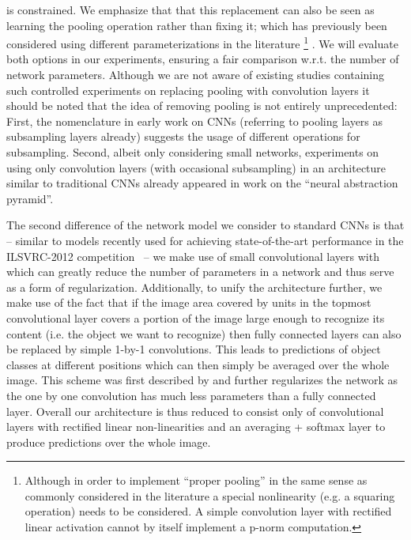\documentclass{article} \usepackage{iclr2015,times}
\begin{document}
is constrained.
We emphasize that that this
replacement can also be seen as 
learning the pooling operation rather than fixing it; which has
previously been considered using different parameterizations in the
literature \footnote{Although in order
  to implement ``proper pooling'' in the same sense as commonly
  considered in the literature a special nonlinearity (e.g. a squaring operation) needs to be
  considered. A simple convolution layer with rectified linear
  activation cannot by itself implement a p-norm computation.}
\citep{LeCun_IEEE1998,Gulcehre_2014,Jia_2012}.
We will evaluate both options in our experiments, ensuring a fair
comparison w.r.t. the number of network parameters. 
Although we are not aware of existing studies   
containing such controlled experiments on replacing pooling with convolution layers
it should be noted that the idea of removing pooling is not entirely unprecedented: 
First, the nomenclature in early work on CNNs \cite{LeCun_IEEE1998} (referring to pooling layers  as 
subsampling layers already) suggests the usage of different operations for subsampling. 
Second, albeit only considering small networks, 
experiments on using only convolution layers (with occasional subsampling) in an architecture similar
to traditional CNNs already appeared in work on the ``neural abstraction pyramid''\cite{Behnke2003}.

The second difference of the network model we consider to standard
CNNs is that -- similar to models recently used for achieving
state-of-the-art performance in the ILSVRC-2012 competition~\citep{VGG_2014,GoingDeep_2014} -- 
we make use of small convolutional layers with  which can
greatly reduce the number of parameters in a network and thus serve as
a form of regularization. 
Additionally, to unify the architecture further, we make use of the
fact that if the image area covered by units in the topmost
convolutional layer covers a portion of the image large enough to
recognize its content (i.e. the object we want to recognize) then
fully connected layers can also be replaced by simple 1-by-1
convolutions. This leads to predictions of object classes at different
positions which can then simply be averaged over the whole image. This
scheme was first described by \citet{Lin_2014} and
further regularizes the network as the one by one convolution has much
less parameters than a fully connected layer.
Overall our architecture is thus reduced to consist only of
convolutional layers with rectified linear non-linearities and an
averaging + softmax layer to produce predictions over the whole image.
\end{document}
